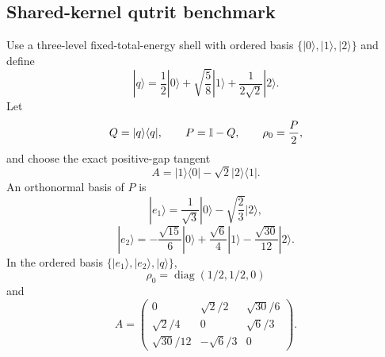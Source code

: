 
\subsection{Shared-kernel qutrit benchmark}
\label{supp:qutrit-benchmark}

Use a three-level fixed-total-energy shell with ordered basis $\{|0\rangle,|1\rangle,|2\rangle\}$ and define
\begin{equation}
|q\rangle
=\frac12|0\rangle
+\sqrt{\frac58}|1\rangle
+\frac{1}{2\sqrt2}|2\rangle.
\end{equation}
Let
\begin{equation}
Q=|q\rangle\langle q|,
\qquad
P=\mathbb I-Q,
\qquad
\rho_0=\frac{P}{2},
\end{equation}
and choose the exact positive-gap tangent
\begin{equation}
A=|1\rangle\langle0|-\sqrt2|2\rangle\langle1|.
\label{eq:qutrit-benchmark-A-physical}
\end{equation}
An orthonormal basis of $P$ is
\begin{equation}
|e_1\rangle
=\frac1{\sqrt3}|0\rangle-\sqrt{\frac23}|2\rangle,
\end{equation}
\begin{equation}
|e_2\rangle
=-\frac{\sqrt{15}}6|0\rangle
+\frac{\sqrt6}{4}|1\rangle
-\frac{\sqrt{30}}{12}|2\rangle.
\end{equation}
In the ordered basis $\{|e_1\rangle,|e_2\rangle,|q\rangle\}$,
\begin{equation}
\rho_0=\operatorname{diag}(1/2,1/2,0)
\end{equation}
and
\begin{equation}
A=
\begin{pmatrix}
0 & \sqrt2/2 & \sqrt{30}/6\\
\sqrt2/4 & 0 & \sqrt6/3\\
\sqrt{30}/12 & -\sqrt6/3 & 0
\end{pmatrix}.
\label{eq:qutrit-benchmark-A-support}
\end{equation}

